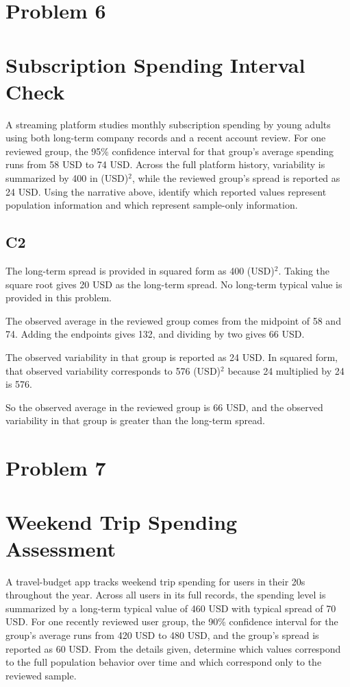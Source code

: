 \begin{ExamProblems}
		\newpage
		\item
		\section{Problem 6}
		\section{Subscription Spending Interval Check}
		A streaming platform studies monthly subscription spending by young adults using both long-term company records and a recent account review.
		For one reviewed group, the 95\% confidence interval for that group's average spending runs from 58 USD to 74 USD.
		Across the full platform history, variability is summarized by 400 in (USD)$^2$, while the reviewed group's spread is reported as 24 USD.
		Using the narrative above, identify which reported values represent population information and which represent sample-only information.

\subsection*{C2}
		The long-term spread is provided in squared form as 400 (USD)$^2$.
		Taking the square root gives 20 USD as the long-term spread.
		No long-term typical value is provided in this problem.

		The observed average in the reviewed group comes from the midpoint of 58 and 74.
		Adding the endpoints gives 132, and dividing by two gives 66 USD.

		The observed variability in that group is reported as 24 USD.
		In squared form, that observed variability corresponds to 576 (USD)$^2$ because 24 multiplied by 24 is 576.

		So the observed average in the reviewed group is 66 USD, and the observed variability in that group is greater than the long-term spread.


		\newpage
		\item
		\section{Problem 7}
		\section{Weekend Trip Spending Assessment}
		A travel-budget app tracks weekend trip spending for users in their 20s throughout the year.
		Across all users in its full records, the spending level is summarized by a long-term typical value of 460 USD with typical spread of 70 USD.
		For one recently reviewed user group, the 90\% confidence interval for the group's average runs from 420 USD to 480 USD, and the group's spread is reported as 60 USD.
		From the details given, determine which values correspond to the full population behavior over time and which correspond only to the reviewed sample.


\end{ExamProblems}
